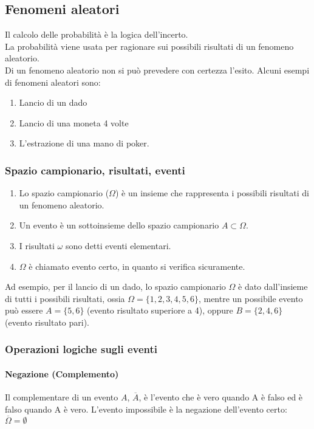 \documentclass{article}
\begin{document}
\subsection{Fenomeni aleatori}
Il calcolo delle probabilità è la logica dell'incerto.\\
La probabilità viene usata per ragionare sui possibili risultati di un fenomeno aleatorio.\\
Di un fenomeno aleatorio non si può prevedere con certezza l'esito.
Alcuni esempi di fenomeni aleatori sono:
\begin{enumerate}
\item Lancio di un dado
\item Lancio di una moneta 4 volte
\item L'estrazione di una mano di poker.
\end{enumerate}
\subsubsection{Spazio campionario, risultati, eventi}
\begin{enumerate}
\item Lo spazio campionario ($\Omega$) è un insieme che rappresenta i possibili risultati di un fenomeno aleatorio.
\item Un evento è un sottoinsieme dello spazio campionario ${A}\subset{\Omega}$.
\item I risultati ${\omega}$ sono detti eventi elementari. 
\item $\Omega$ è chiamato evento certo, in quanto si verifica sicuramente.
\end{enumerate}
Ad esempio, per il lancio di un dado, lo spazio campionario $\Omega$ è dato dall'insieme di tutti i possibili risultati, ossia $\Omega = \{1,2,3,4,5,6\}$, mentre un possibile evento può essere $A=\{5,6\}$ (evento risultato superiore a 4), oppure $B=\{2,4,6\}$ (evento risultato pari).
\subsubsection{Operazioni logiche sugli eventi}
\paragraph{Negazione (Complemento)\\}
Il complementare di un evento $A$, $\overline{A}$, è l'evento che è vero quando A è falso ed è falso quando A è vero.
L'evento impossibile è la negazione dell'evento certo: $\overline{\Omega} = \emptyset$
\end{document}
